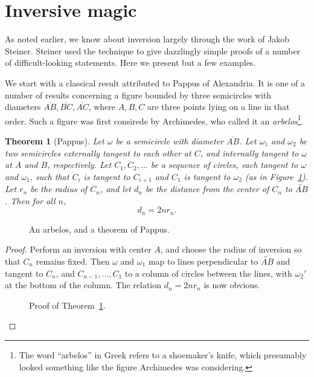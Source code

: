 \documentclass[12pt]{book}
\numberwithin{exc}{section}
\numberwithin{figure}{section}
\newtheorem{theorem}{Theorem}[section]
\numberwithin{equation}{theorem}
\def\line#1{\overleftrightarrow{#1}}
\def\seg#1{\overline{#1}}
\begin{document}
\section{Inversive magic}
\label{sec:inv magic}

As noted earlier, we know about inversion largely through the work of
Jakob Steiner.  Steiner used the technique to give
dazzlingly simple proofs of a number of difficult-looking statements.
Here we present but a few examples.

We start with a classical result attributed to Pappus of Alexandria. 
It is one of a number of results concerning a figure bounded by three
semicircles with diameters $\seg{AB},\seg{BC},\seg{AC}$, where $A,B,C$
are three points lying on a line in that order. Such a figure was first
consirede by Archimedes, who called it an \emph{arbelos}\footnote{The word 
``arbelos'' in Greek refers to a shoemaker's knife, which presumably looked
something like the figure Archimedes was considering.}. 

\begin{theorem} [Pappus] \label{thm:papinv}
Let $\omega$ be a semicircle with diameter $\seg{AB}$. Let $\omega_{1}$ and 
$\omega_{2}$ be two semicircles externally tangent to each other at $C$, and 
internally tangent to $\omega$ at $A$ and $B$, respectively. 
Let $C_{1}, C_{2}, \dots$ be a sequence of circles, each tangent to 
$\omega$ and $\omega_{1}$, such that $C_{i}$ is tangent to $C_{i+1}$ 
and $C_{1}$ is tangent to $\omega_{2}$ (as in Figure~\ref{fig:arbelos}).
Let $r_{n}$ 
be the radius of $C_{n}$, and let $d_{n}$ be the distance from the center of 
$C_{n}$ to $\line{AB}$. Then for all $n$,
\[
d_{n} = 2n r_{n}.
\]
\end{theorem}
\begin{figure}[ht]
\caption{An arbelos, and a theorem of Pappus.}
\label{fig:arbelos}
\end{figure}
\begin{proof}
Perform an inversion with center $A$, and choose the radius of 
inversion so that $C_{n}$ remains fixed. Then $\omega$ and 
$\omega_{1}$ map to lines perpendicular to $\line{AB}$ and tangent to 
$C_{n}$, and $C_{n-1}, \dots, C_{1}$ to a column of circles between 
the lines, with $\omega_{2}'$ at the bottom of the column. The 
relation $d_{n} = 2n r_{n}$ is now obvious.
\begin{figure}[ht]
\caption{Proof of Theorem~\ref{thm:papinv}.}
\end{figure}
\end{proof}
\end{document}
